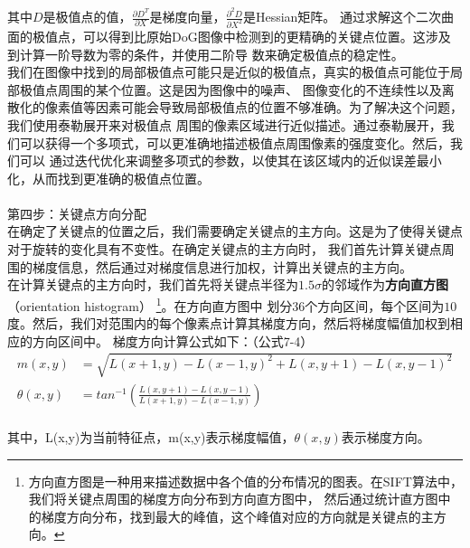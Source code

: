 \documentclass{nwputhesis}
\begin{document}
\indent
其中$D$是极值点的值，$\frac{\partial D^T}{\partial X}$是梯度向量，$\frac{\partial^2D}{\partial X^2}$是Hessian矩阵。
通过求解这个二次曲面的极值点，可以得到比原始DoG图像中检测到的更精确的关键点位置。这涉及到计算一阶导数为零的条件，并使用二阶导
数来确定极值点的稳定性。
\\
\indent
我们在图像中找到的局部极值点可能只是近似的极值点，真实的极值点可能位于局部极值点周围的某个位置。这是因为图像中的噪声、
图像变化的不连续性以及离散化的像素值等因素可能会导致局部极值点的位置不够准确。为了解决这个问题，我们使用泰勒展开来对极值点
周围的像素区域进行近似描述。通过泰勒展开，我们可以获得一个多项式，可以更准确地描述极值点周围像素的强度变化。然后，我们可以
通过迭代优化来调整多项式的参数，以使其在该区域内的近似误差最小化，从而找到更准确的极值点位置。\\
\\
第四步：关键点方向分配\\
\indent
在确定了关键点的位置之后，我们需要确定关键点的主方向。这是为了使得关键点对于旋转的变化具有不变性。在确定关键点的主方向时，
我们首先计算关键点周围的梯度信息，然后通过对梯度信息进行加权，计算出关键点的主方向。\\
\indent
在计算关键点的主方向时，我们首先将关键点半径为$1.5\sigma$的邻域作为\textbf{方向直方图}（orientation histogram）
\footnote{方向直方图是一种用来描述数据中各个值的分布情况的图表。在SIFT算法中，我们将关键点周围的梯度方向分布到方向直方图中，
然后通过统计直方图中的梯度方向分布，找到最大的峰值，这个峰值对应的方向就是关键点的主方向。}。在方向直方图中
划分$36$个方向区间，每个区间为$10$度。然后，我们对范围内的每个像素点计算其梯度方向，然后将梯度幅值加权到相应的方向区间中。
梯度方向计算公式如下：（公式7-4）\\
\begin{equation}
    \begin{aligned}
        m(x,y) &= \sqrt{L(x+1,y) - L(x-1,y)^2 + L(x,y+1) - L(x,y-1)^2}\\
        \theta(x,y) &= tan^{-1}(\frac{L(x,y+1) - L(x,y-1)}{L(x+1,y) - L(x-1,y)})\\
    \end{aligned}
\end{equation}

其中，L(x,y)为当前特征点，m(x,y)表示梯度幅值，$\theta(x,y)$表示梯度方向。\\
\end{document}
